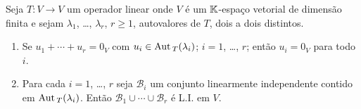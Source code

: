 \begin{teorema}
	Seja $T : V \to V$ um operador linear onde $V$ \'e um $\mathbb{K}$-espa\c{c}o vetorial de dimens\~ao finita e sejam $\lambda_1$, \dots, $\lambda_r$, $r \ge 1$, autovalores de $T$, dois a dois distintos.
	\begin{enumerate}[label={\roman*})]
		\item\label{autovetorLI} Se $u_1 + \cdots + u_r = 0_V$ com $u_i \in {\rm Aut\,}_T(\lambda_i)$; $i = 1$, \dots, $r$; ent\~ao $u_i = 0_V$ para todo $i$.
		\item Para cada $i = 1$, \dots, $r$ seja $\mathcal{B}_i$ um conjunto linearmente independente contido em ${\rm Aut\,}_T(\lambda_i)$. Ent\~ao $\mathcal{B}_1 \cup \cdots \cup \mathcal{B}_r$ \'e L.I. em $V$.
	\end{enumerate}
\end{teorema}
